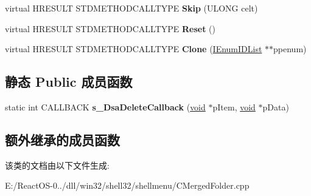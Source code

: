 \begin{DoxyCompactItemize}
virtual H\+R\+E\+S\+U\+LT S\+T\+D\+M\+E\+T\+H\+O\+D\+C\+A\+L\+L\+T\+Y\+PE {\bfseries Skip} (U\+L\+O\+NG celt)
\item 
\mbox{\label{class_c_enum_merged_folder_a18ee9b5f1b7281ccc946de9c4ea699dc}} 
virtual H\+R\+E\+S\+U\+LT S\+T\+D\+M\+E\+T\+H\+O\+D\+C\+A\+L\+L\+T\+Y\+PE {\bfseries Reset} ()
\item 
\mbox{\label{class_c_enum_merged_folder_a86bb0ffd4798f53c07d4f821f2245c1c}} 
virtual H\+R\+E\+S\+U\+LT S\+T\+D\+M\+E\+T\+H\+O\+D\+C\+A\+L\+L\+T\+Y\+PE {\bfseries Clone} (\hyperlink{interface_i_enum_i_d_list}{I\+Enum\+I\+D\+List} $\ast$$\ast$ppenum)
\end{DoxyCompactItemize}
\subsection*{静态 Public 成员函数}
\begin{DoxyCompactItemize}
\item 
\mbox{\label{class_c_enum_merged_folder_a52a8b98acee17ce1b5f82f6c32301c1d}} 
static int C\+A\+L\+L\+B\+A\+CK {\bfseries s\+\_\+\+Dsa\+Delete\+Callback} (\hyperlink{interfacevoid}{void} $\ast$p\+Item, \hyperlink{interfacevoid}{void} $\ast$p\+Data)
\end{DoxyCompactItemize}
\subsection*{额外继承的成员函数}


该类的文档由以下文件生成\+:\begin{DoxyCompactItemize}
\item 
E\+:/\+React\+O\+S-\/0../dll/win32/shell32/shellmenu/C\+Merged\+Folder.\+cpp\end{DoxyCompactItemize}
